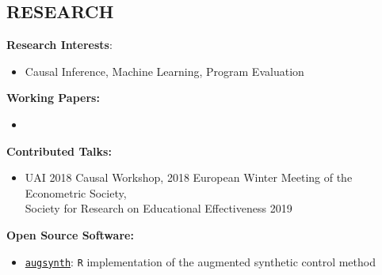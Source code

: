 \documentclass{res}
\begin{document}
\begin{resume}
\section{RESEARCH}
\textbf{Research Interests}:
\begin{itemize}
\item[] Causal Inference, Machine Learning, Program Evaluation%
\end{itemize}%
\vspace{-4mm}
\textbf{Working Papers:}
\begin{itemize}
\item[] 
\end{itemize}
\vspace{-4mm}
\textbf{Contributed Talks:}
\begin{itemize}
\item[] UAI 2018 Causal Workshop, 2018 European Winter Meeting of the Econometric Society,
\\Society for Research on Educational Effectiveness 2019
\end{itemize}
\vspace{-4mm}
\textbf{Open Source Software:}
\begin{itemize}
\item[] \href{https://github.com/ebenmichael/augsynth}{\texttt{augsynth}}: \texttt{R} implementation of the augmented synthetic control method
\end{itemize}

\end{resume}
\end{document}
